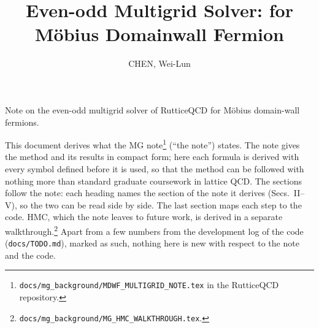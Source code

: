 \documentclass[11pt,a4paper]{article}
\title{\textsf{\bfseries Even-odd Multigrid Solver: for M\"obius Domainwall Fermion}}
\author{CHEN, Wei-Lun}
\date{}
\numberwithin{equation}{section}
\newcommand{\code}[1]{\texttt{\small #1}}
\begin{document}
\maketitle

Note on the even-odd multigrid solver of RutticeQCD for M\"obius domain-wall fermions.


This document derives what the MG note\footnote{\code{docs/mg\_background/MDWF\_MULTIGRID\_NOTE.tex}
in the RutticeQCD repository.} (``the note'') states. The note gives the method and its results in compact form; here each formula
is derived with every symbol defined before it is used, so that the method can be
followed with nothing more than standard graduate coursework in lattice QCD. The sections follow the
note: each heading names the section of the note it derives (Secs.~II--V), so the two can be read
side by side. The last section maps each step to the code. HMC, which the note leaves to future
work, is derived in a separate walkthrough.\footnote{\code{docs/mg\_background/MG\_HMC\_WALKTHROUGH.tex}.}
Apart from a few numbers from the development log of the code (\code{docs/TODO.md}), marked as
such, nothing here is new with respect to the note and the code.
\end{document}
